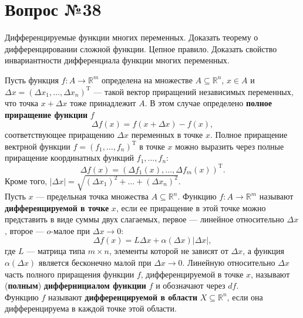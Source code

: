 \documentclass[12pt]{report}
\numberwithin{equation}{section}
\begin{document}
\newpage \section{Вопрос №38} %
\begin{framed}
Дифференцируемые функции многих переменных. Доказать теорему о дифференцировании сложной функции. Цепное правило. Доказать свойство инвариантности дифференциала функции многих переменных.
\end{framed}
Пусть функция $f : A \to \mathbb{R}^m$ определена  на множестве $A \subseteq \mathbb{R}^n$, $x \in A$ и $\Delta x = (\Delta x_1, \ldots, \Delta x_n)^{\mathrm{T}}$ --- такой вектор приращений независимых переменных, что точка $x + \Delta x$ тоже принадлежит $A$. В этом случае определено \textbf{полное приращение функции} $f$
\[ \Delta f(x) = f(x + \Delta x) - f(x),\]
соответствующее приращению $\Delta x$ переменных в точке $x$. Полное приращение вектрной функции $f = (f_1, \ldots, f_n)^{\mathrm{T}}$ в точке $x$ можно выразить через полные приращение координатных функций $f_1, \ldots, f_n$:
\begin{equation*} \Delta f(x) = (\Delta f_1(x), \ldots, \Delta f_m(x))^{\mathrm{T}}. \end{equation*}
Кроме того, $|\Delta x| = \sqrt{(\Delta x_1)^2 + \dots + (\Delta x_n)^2}$.\\


Пусть $x$ --- предельная точка множества $A \subseteq \mathbb{R}^n$. Функцию $f: A \to \mathbb{R}^m$ называют \textbf{дифференцируемой в точке} $x$, если ее приращение в этой точке можно представить в виде суммы двух слагаемых, первое --- линейное относительно $\Delta x$, второе --- $o$-малое при $\Delta x \to 0$:
\begin{equation*}
\Delta f(x) = L \Delta x + \alpha(\Delta x)|\Delta x|,
\end{equation*}
где $L$ --- матрица типа $m \times n$, элементы которой не зависят от $\Delta x$, а функция $\alpha(\Delta x)$ является бесконечно малой при $\Delta x \to 0$. Линейную относительно $\Delta x$ часть полного приращения функции $f$, дифференцируемой в точке $x$, называют (\textbf{полным}) \textbf{диффернициалом функции} $f$ и обозначают через $df$.\\

Функцию $f$ называют \textbf{дифференцируемой в области} $X \subseteq \mathbb{R}^n$, если она дифференцируема в каждой точке этой области.\\
\end{document}
